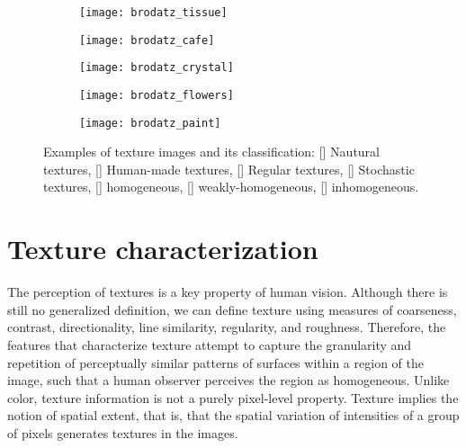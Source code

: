 \begin{figure}[!ht]
    \begin{subfigure}[b]{0.19\textwidth}
        \texttt{[image: brodatz\_tissue]}
        \caption{}
    \end{subfigure}
    \begin{subfigure}[b]{0.19\textwidth}
        \texttt{[image: brodatz\_cafe]}
        \caption{}
    \end{subfigure} 
    \begin{subfigure}[b]{0.19\textwidth}
        \texttt{[image: brodatz\_crystal]}
        \caption{}
    \end{subfigure}
    \begin{subfigure}[b]{0.19\textwidth}
        \texttt{[image: brodatz\_flowers]}
        \caption{}
    \end{subfigure}
    \begin{subfigure}[b]{0.19\textwidth}
        \texttt{[image: brodatz\_paint]}
        \caption{}
    \end{subfigure}    
                  
    \caption{Examples of texture images and its classification: [] Nautural textures, [] Human-made textures, [] Regular textures, [] Stochastic textures, [] homogeneous, [] weakly-homogeneous, [] inhomogeneous.}\label{fig:texture_images}    
\end{figure}


\section{Texture characterization}
The perception of textures is a key property of human vision. Although there is still no generalized definition, we can define texture using measures of coarseness, contrast, directionality, line similarity, regularity, and roughness. Therefore, the features that characterize texture attempt to capture the granularity and repetition of perceptually similar patterns of surfaces within a region of the image, such that a human observer perceives the region as homogeneous. Unlike color, texture information is not a purely pixel-level property. Texture implies the notion of spatial extent, that is, that the spatial variation of intensities of a group of pixels generates textures in the images.


